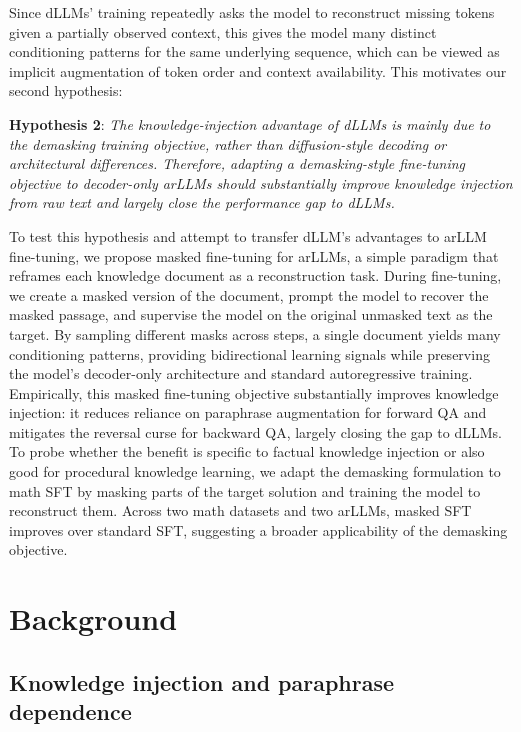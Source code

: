 Since dLLMs' training repeatedly asks the model to reconstruct missing tokens given a partially observed context, this gives the model many distinct conditioning patterns for the same underlying sequence, which can be viewed as implicit augmentation of token order and context availability. This motivates our second hypothesis:

\textbf{Hypothesis 2}: \textit{The knowledge-injection advantage of dLLMs is mainly due to the demasking training objective, rather than diffusion-style decoding or architectural differences. Therefore, adapting a demasking-style fine-tuning objective to decoder-only arLLMs should substantially improve knowledge injection from raw text and largely close the performance gap to dLLMs.}

To test this hypothesis and attempt to transfer dLLM's advantages to arLLM fine-tuning, we propose masked fine-tuning for arLLMs, a simple paradigm that reframes each knowledge document as a reconstruction task. During fine-tuning, we create a masked version of the document, prompt the model to recover the masked passage, and supervise the model on the original unmasked text as the target. By sampling different masks across steps, a single document yields many conditioning patterns, providing bidirectional learning signals while preserving the model’s decoder-only architecture and standard autoregressive training. Empirically, this masked fine-tuning objective substantially improves knowledge injection: it reduces reliance on paraphrase augmentation for forward QA and mitigates the reversal curse for backward QA, largely closing the gap to dLLMs. To probe whether the benefit is specific to factual knowledge injection or also good for procedural knowledge learning, we adapt the demasking formulation to math SFT by masking parts of the target solution and training the model to reconstruct them. Across two math datasets and two arLLMs, masked SFT improves over standard SFT, suggesting a broader applicability of the demasking objective.


\section{Background}

\subsection{Knowledge injection and paraphrase dependence}

